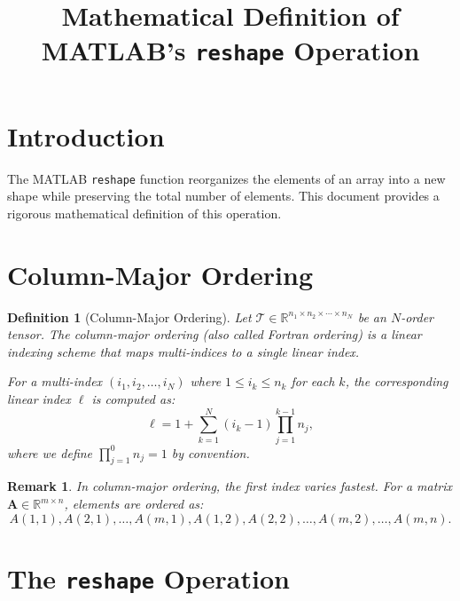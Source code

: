 \documentclass[11pt]{article}
\title{Mathematical Definition of MATLAB's \texttt{reshape} Operation}
\author{}
\date{}
\newtheorem{definition}{Definition}
\newtheorem{remark}{Remark}
\begin{document}
\maketitle

\section{Introduction}

The MATLAB \texttt{reshape} function reorganizes the elements of an array into a new shape while preserving the total number of elements. This document provides a rigorous mathematical definition of this operation.

\section{Column-Major Ordering}

\begin{definition}[Column-Major Ordering]
Let $\mathcal{T} \in \mathbb{R}^{n_1 \times n_2 \times \cdots \times n_N}$ be an $N$-order tensor. The \emph{column-major ordering} (also called \emph{Fortran ordering}) is a linear indexing scheme that maps multi-indices to a single linear index.

For a multi-index $(i_1, i_2, \ldots, i_N)$ where $1 \leq i_k \leq n_k$ for each $k$, the corresponding linear index $\ell$ is computed as:
\[
\ell = 1 + \sum_{k=1}^{N} (i_k - 1) \prod_{j=1}^{k-1} n_j,
\]
where we define $\prod_{j=1}^{0} n_j = 1$ by convention.
\end{definition}

\begin{remark}
In column-major ordering, the first index varies fastest. For a matrix $\bm{A} \in \mathbb{R}^{m \times n}$, elements are ordered as:
\[
A(1,1), A(2,1), \ldots, A(m,1), A(1,2), A(2,2), \ldots, A(m,2), \ldots, A(m,n).
\]
\end{remark}

\section{The \texttt{reshape} Operation}
\end{document}
